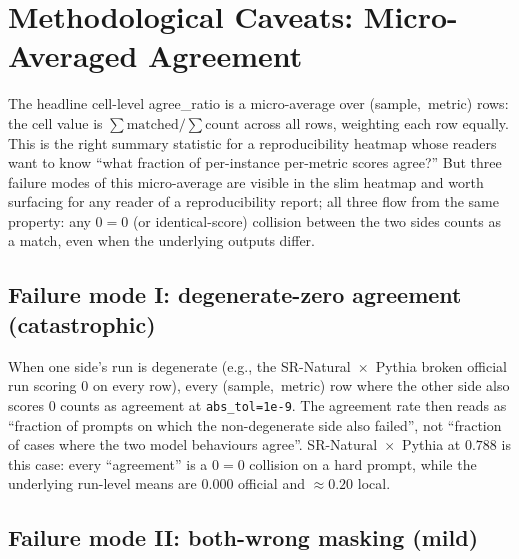 \documentclass[11pt]{article}
\begin{document}
\section{Methodological Caveats: Micro-Averaged Agreement}
\label{sec:tr-microavg}

The headline cell-level agree\_ratio is a micro-average over
  \mbox{(sample, metric)} rows: the cell value is
  $\sum \text{matched} / \sum \text{count}$ across all rows, weighting
  each row equally.
This is the right summary statistic for a reproducibility heatmap
  whose readers want to know ``what fraction of per-instance per-metric
  scores agree?''
But three failure modes of this micro-average are visible in the slim
  heatmap and worth surfacing for any reader of a reproducibility
  report; all three flow from the same property: any $0=0$ (or
  identical-score) collision between the two sides counts as a match,
  even when the underlying outputs differ.

\subsection{Failure mode I: degenerate-zero agreement (catastrophic)}
\label{sec:tr-microavg-degenerate}

When one side's run is degenerate
  (e.g., the SR-Natural~$\times$~Pythia broken official run scoring
  $0$ on every row), every \mbox{(sample, metric)} row where the
  other side also scores $0$ counts as agreement at \texttt{abs\_tol=1e-9}.
The agreement rate then reads as ``fraction of prompts on which the
  non-degenerate side also failed'', not ``fraction of cases where
  the two model behaviours agree''.
SR-Natural~$\times$~Pythia at $0.788$ is this case: every
  ``agreement'' is a $0=0$ collision on a hard prompt, while the
  underlying run-level means are $0.000$ official and $\approx 0.20$
  local.

\subsection{Failure mode II: both-wrong masking (mild)}
\label{sec:tr-microavg-both-wrong}
\end{document}
